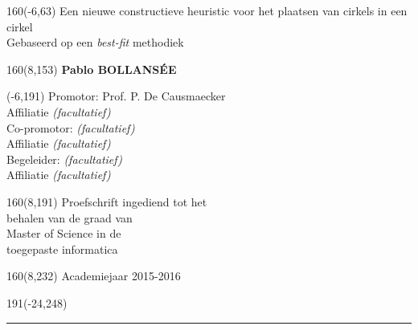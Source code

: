 \documentclass[12pt,a4paper,oneside]{book}
\begin{document}
%
\begin{textblock}{160}(-6,63)
\textblockcolour{}
\vspace{-\parskip}
\flushleft
\fontsize{40}{42}\selectfont \textcolor{bluetitle}{Een nieuwe constructieve heuristic voor het plaatsen van cirkels in een cirkel}\\[1.5mm]
\fontsize{20}{22}\selectfont Gebaseerd op een \textit{best-fit} methodiek
\end{textblock}
%
\begin{textblock}{160}(8,153)
\textblockcolour{}
\vspace{-\parskip}
\flushright
\fontsize{14}{16}\selectfont \textbf{Pablo BOLLANSÉE}
\end{textblock}
%
\begin{textblock}{70}(-6,191)
\textblockcolour{}
\vspace{-\parskip}
\flushleft
Promotor: Prof. P. De Causmaecker \\[-2pt]
\textcolor{blueaff}{Affiliatie \textsl{(facultatief)}}\\[5pt]
Co-promotor: \textsl{(facultatief)}\\[-2pt]
\textcolor{blueaff}{Affiliatie \textsl{(facultatief)}}\\[5pt]
Begeleider: \textsl{(facultatief)}\\[-2pt]
\textcolor{blueaff}{Affiliatie \textsl{(facultatief)}}\\
\end{textblock}
%
\begin{textblock}{160}(8,191)
\textblockcolour{}
\vspace{-\parskip}
\flushright
Proefschrift ingediend tot het\\[4.5pt]
behalen van de graad van\\[4.5pt]
Master of Science in de\\[4.5pt]
toegepaste informatica\\
\end{textblock}
%
\begin{textblock}{160}(8,232)
\textblockcolour{}
\vspace{-\parskip}
\flushright
Academiejaar 2015-2016
\end{textblock}
%
\begin{textblock}{191}(-24,248)
{\color{blueline}\rule{550pt}{5.5pt}}
\end{textblock}
%
\vfill
\end{document}
